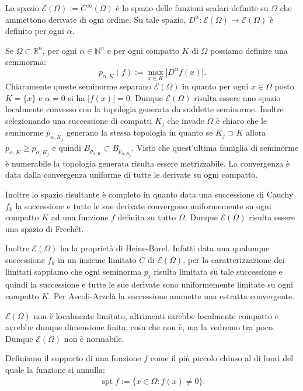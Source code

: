 \documentclass[italian,a4paper,oneside,headinclude]{scrbook}
\newcommand{\E}{\mathcal E}
\newcommand{\NN}{\mathbb N}
\newcommand{\RR}{\mathbb R}
\newcommand{\abs}[1]{{\left|#1\right|}}
\newcommand{\defeq}{:=}
\DeclareMathOperator{\spt}{spt}
\begin{document}
Lo spazio $\E(\Omega)\defeq C^\infty(\Omega)$ è lo spazio delle funzioni scalari
\marginpar{$\E(\Omega)$}
definite su $\Omega$ che ammettono derivate di ogni ordine. Su tale
spazio, $D^\alpha\colon \E(\Omega)\to \E(\Omega)$ è definito per ogni $\alpha$.

Se $\Omega\subset \RR^n$, per ogni $\alpha \in \NN^n$ e per ogni
compatto $K$ di $\Omega$ possiamo definire una seminorma:
\begin{equation}\label{eq:palphaK}
p_{\alpha,K}(f) \defeq \max_{x\in K} \abs{D^\alpha f(x)}.
\end{equation}
Chiaramente queste seminorme separano $\E(\Omega)$ in quanto
per ogni $x\in \Omega$ posto $K=\{x\}$ e $\alpha=0$ si ha $\abs{f(x)}=0$.
Dunque $\E(\Omega)$ risulta essere uno spazio
localmente convesso con la topologia generata da suddette
seminorme. Inoltre selezionando una successione di compatti $K_j$ che
invade $\Omega$ è chiaro che le seminorme $p_{\alpha,K_j}$ generano la
stessa topologia in quanto se $K_j \supset K$ allora $p_{\alpha,K}\ge
p_{\alpha, K_j}$ e quindi $B_{p_{\alpha,K}}\subset B_{p_{\alpha, K_j}}$.
Visto che quest'ultima famiglia di seminorme è numerabile la topologia
generata risulta essere metrizzabile.
La convergenza è data dalla convergenza
uniforme di tutte le derivate su ogni compatto.

Inoltre lo spazio risultante è completo in quanto data una successione
di Cauchy $f_k$ la successione e tutte le sue derivate convergono
uniformemente su ogni compatto $K$ ad una funzione $f$ definita su
tutto $\Omega$. Dunque $\E(\Omega)$ risulta essere uno spazio di
Frechét.

Inoltre $\E(\Omega)$ ha la proprietà di Heine-Borel. Infatti
data una qualunque successione $f_k$ in un insieme limitato $C$ di
$\E(\Omega)$,
per la
caratterizzazione dei limitati sappiamo che ogni seminorma $p_j$
risulta limitata su tale successione e quindi la successione e tutte
le sue derivate sono uniformemente limitate su ogni compatto $K$. Per
Ascoli-Arzelà la successione ammette una estratta convergente.

$\E(\Omega)$ non è localmente limitato, altrimenti sarebbe
localmente compatto e avrebbe dunque dimensione finita, cosa che non
è, ma la vedremo tra poco.
Dunque
$\E(\Omega)$ non è normabile.

Definiamo il supporto di una funzione $f$ come il più piccolo chiuso
al di fuori del quale la funzione si annulla:
\[
\spt f \defeq \overline{\{x\in \Omega\colon f(x)\neq 0\}}.
\]
\end{document}

